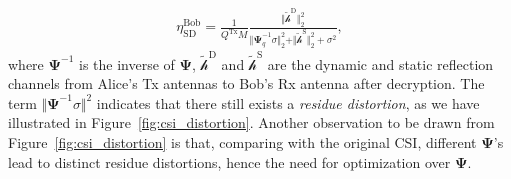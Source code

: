 \documentclass[conference,compsoc]{IEEEtran}
\begin{document}
%
\begin{align} \label{eq:sdnrBob}
	\eta_{\mathrm{SD}}^{\mathrm{Bob}} = \frac{1}{Q^{\mathrm{Tx}}M} 
	\frac{ \Vert  \tilde{\bm{\mathcal{h}}}^{\mathrm{D}} \Vert^2_2   }{   \Vert {\bm{\Psi}}_q^{-1}  \sigma	 \Vert^{2}_2   +  \Vert  \tilde{\bm{\mathcal{h}}}^{\mathrm{S}}  \Vert^2_2 +  \sigma^2 }, 
\end{align}
%
where $ \bm{\Psi}^{-1} $ is the inverse of $\bm{\Psi}$,
$ \tilde{\bm{\mathcal{h}}}^{\mathrm{D}}$  and $ \tilde{\bm{\mathcal{h}}}^{\mathrm{S}} $ are the dynamic and static reflection channels from Alice's Tx antennas to Bob's Rx antenna after decryption.
The term $ \Vert \bm{\Psi}^{-1}  \sigma	 \Vert^{2} $ indicates that there still exists a \textit{residue distortion}, as we have illustrated in Figure~\ref{fig:csi_distortion}. Another observation to be drawn from Figure~\ref{fig:csi_distortion} is that, comparing with the original CSI, different $\bm{\Psi}$'s lead to distinct residue distortions, hence the need for optimization over $\bm{\Psi}$.
\end{document}
